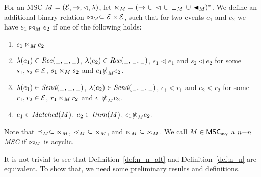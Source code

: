 \begin{definition} \label{def:n_n_alt}
	For an MSC $\msc = (\Events,\procrel,\lhd,\lambda)$, let ${\nnrel}_\msc = ({\procrel} \,\cup\, {\lhd} \,\cup\, {\mbrel_\msc} \,\cup\, {\onenrel_\msc})^\ast$. We define an additional binary relation $\bowtie_\msc \subseteq \Events \times \Events$, such that for two events $e_1$ and $e_2$ we have $e_1 \bowtie_\msc e_2$ if one of the following holds:
	\begin{enumerate}\itemsep=0.5ex
		\item $e_1 \nnrel_\msc e_2$
		\item $\lambda(e_1) \in \prAct{\plh}$, $\lambda(e_2) \in \prAct{\plh}$, $s_1 \lhd e_1$ and $s_2 \lhd e_2$ for some $s_1,s_2 \in \Events$, $s_1 \nnrel_\msc s_2$ and $e_1 \slashed{\nnrel}_\msc e_2$.
		\item $\lambda(e_1) \in \psAct{\plh}$, $\lambda(e_2) \in \psAct{\plh}$, $e_1 \lhd r_1$ and $e_2 \lhd r_2$ for some $r_1,r_2 \in \Events$, $r_1 \nnrel_\msc r_2$ and $e_1 \slashed{\nnrel}_\msc e_2$.
		\item $e_1 \in \Matched{\msc}$, $e_2 \in \Unm{\msc}$, $e_1 \slashed{\nnrel}_\msc e_2$.
	\end{enumerate}
	
	Note that $\preceq_\msc \subseteq \nnrel_\msc$, $\lessdot_\msc \subseteq \nnrel_\msc$, and $\nnrel_\msc \subseteq\; \bowtie_\msc$. We call $\msc \in \asMSCs$ a \emph{$\nn$ MSC}
	if ${\bowtie_\msc}$ is acyclic.
\end{definition}

It is not trivial to see that Definition~\ref{def:n_n_alt} and Definition~\ref{def:n_n} are equivalent. To show that, we need some preliminary results and definitions. 

